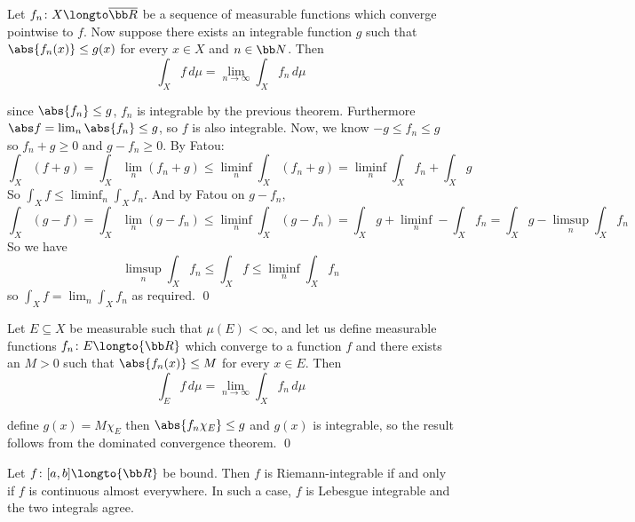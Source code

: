 \bthrm[title=Dominated Convergence Theorem, name=domconv]

    Let $f_n\colon X\longto\overline{\bb R}$ be a sequence of measurable functions which converge pointwise to $f$.
    Now suppose there exists an integrable function $g$ such that $\abs{f_n(x)}\leq g(x)$ for every $x\in X$ and $n\in{\bb N}$.
    Then
    $$ \int_Xf\,d\mu = \lim_{n\to\infty}\int_Xf_n\,d\mu $$

\ethrm

\Proof since $\abs{f_n}\leq g$, $f_n$ is integrable by the previous theorem.
Furthermore $\abs f=\lim_n\abs{f_n}\leq g$, so $f$ is also integrable.
Now, we know $-g\leq f_n\leq g$ so $f_n+g\geq0$ and $g-f_n\geq0$.
By Fatou:
$$ \int_X(f+g) = \int_X\lim_n(f_n+g) \leq \liminf_n\int_X(f_n+g) = \liminf_n\int_Xf_n + \int_Xg $$
So $\int_Xf\leq\liminf_n\int_Xf_n$.
And by Fatou on $g-f_n$,
$$ \int_X(g-f) = \int_X\lim_n(g-f_n) \leq \liminf_n\int_X(g-f_n) = \int_Xg + \liminf_n-\int_Xf_n = \int_Xg - \limsup_n\int_Xf_n $$
So we have
$$ \limsup_n\int_Xf_n \leq \int_Xf \leq \liminf_n\int_Xf_n $$
so $\int_Xf=\lim_n\int_Xf_n$ as required.
\qed

\bthrm[title=Bounded Convergence Theorem, name=boundconv]

    Let $E\subseteq X$ be measurable such that $\mu(E)<\infty$, and let us define measurable functions $f_n\colon E\longto{\bb R}$ which converge to a function $f$ and there exists an $M>0$ such that
    $\abs{f_n(x)}\leq M$ for every $x\in E$.
    Then
    $$ \int_Ef\,d\mu = \lim_{n\to\infty}\int_Xf_n\,d\mu $$

\ethrm

\Proof define $g(x)=M\chi_E$ then $\abs{f_n\chi_E}\leq g$ and $g(x)$ is integrable, so the result follows from the dominated convergence theorem.
\qed

\bthrm[title=Equivalence of Riemann and Lebesgue Integrals, name=rlequiv]

    Let $f\colon[a,b]\longto{\bb R}$ be bound.
    Then $f$ is Riemann-integrable if and only if $f$ is continuous almost everywhere.
    In such a case, $f$ is Lebesgue integrable and the two integrals agree.

\ethrm

